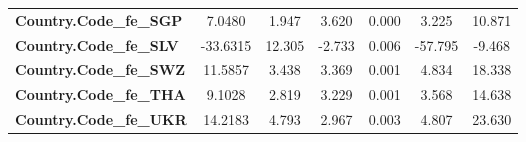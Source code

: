 \begin{center}
\begin{tabular}{lcccccc}
\textbf{Country.Code\_fe\_SGP}                                     &       7.0480  &        1.947     &     3.620  &         0.000        &        3.225    &       10.871     \\
\textbf{Country.Code\_fe\_SLV}                                     &     -33.6315  &       12.305     &    -2.733  &         0.006        &      -57.795    &       -9.468     \\
\textbf{Country.Code\_fe\_SWZ}                                     &      11.5857  &        3.438     &     3.369  &         0.001        &        4.834    &       18.338     \\
\textbf{Country.Code\_fe\_THA}                                     &       9.1028  &        2.819     &     3.229  &         0.001        &        3.568    &       14.638     \\
\textbf{Country.Code\_fe\_UKR}                                     &      14.2183  &        4.793     &     2.967  &         0.003        &        4.807    &       23.630     \\
\bottomrule
\end{tabular}
\end{center}